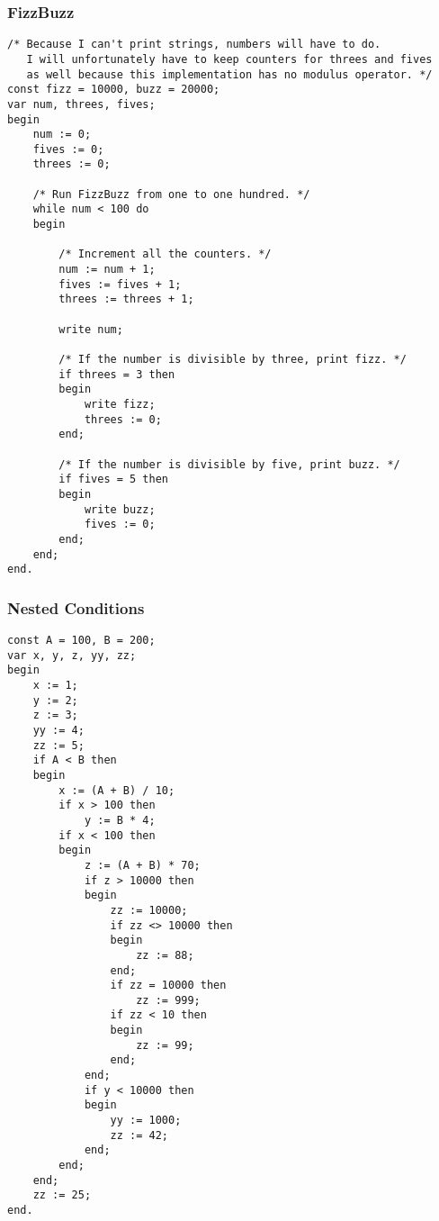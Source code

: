 \documentclass[12pt]{memoir}
\begin{document}
\pagebreak

\subsubsection*{FizzBuzz}
\begin{lstlisting}
/* Because I can't print strings, numbers will have to do.
   I will unfortunately have to keep counters for threes and fives
   as well because this implementation has no modulus operator. */
const fizz = 10000, buzz = 20000;
var num, threes, fives;
begin
    num := 0;
    fives := 0;
    threes := 0;
    
    /* Run FizzBuzz from one to one hundred. */
    while num < 100 do
    begin

        /* Increment all the counters. */
        num := num + 1;
        fives := fives + 1;
        threes := threes + 1;
    
        write num;

        /* If the number is divisible by three, print fizz. */
        if threes = 3 then
        begin
            write fizz;
            threes := 0;
        end;

        /* If the number is divisible by five, print buzz. */
        if fives = 5 then
        begin
            write buzz;
            fives := 0;
        end;
    end;
end.
\end{lstlisting}

\pagebreak

\subsubsection*{Nested Conditions}
\begin{lstlisting}
const A = 100, B = 200;
var x, y, z, yy, zz;
begin
    x := 1;
    y := 2;
    z := 3;
    yy := 4;
    zz := 5;
    if A < B then
    begin
        x := (A + B) / 10;
        if x > 100 then
            y := B * 4;
        if x < 100 then
        begin
            z := (A + B) * 70;
            if z > 10000 then
            begin
                zz := 10000;
                if zz <> 10000 then
                begin
                    zz := 88;
                end;
                if zz = 10000 then
                    zz := 999;
                if zz < 10 then
                begin
                    zz := 99;
                end;
            end;
            if y < 10000 then
            begin
                yy := 1000;
                zz := 42;
            end;
        end;
    end;
    zz := 25;
end.
\end{lstlisting}
\end{document}
